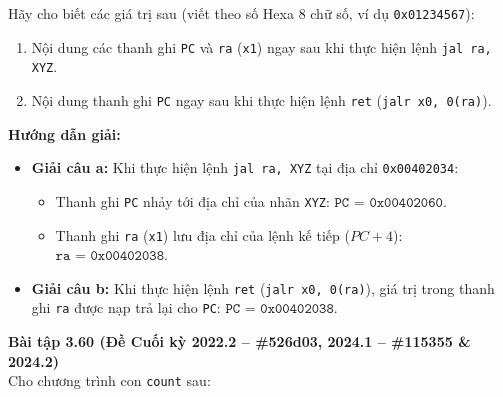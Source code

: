Hãy cho biết các giá trị sau (viết theo số Hexa 8 chữ số, ví dụ \texttt{0x01234567}):
\begin{enumerate}[label=\alph*)]
    \item Nội dung các thanh ghi \texttt{PC} và \texttt{ra} (\texttt{x1}) ngay sau khi thực hiện lệnh \texttt{jal ra, XYZ}.
    \item Nội dung thanh ghi \texttt{PC} ngay sau khi thực hiện lệnh \texttt{ret} (\texttt{jalr x0, 0(ra)}).
\end{enumerate}
\textbf{Hướng dẫn giải:}
\begin{itemize}
    \item \textbf{Giải câu a:} Khi thực hiện lệnh \texttt{jal ra, XYZ} tại địa chỉ \texttt{0x00402034}:
    \begin{itemize}
        \item Thanh ghi \texttt{PC} nhảy tới địa chỉ của nhãn \texttt{XYZ}: $\mathbf{\texttt{PC = 0x00402060}}$.
        \item Thanh ghi \texttt{ra} (\texttt{x1}) lưu địa chỉ của lệnh kế tiếp ($PC + 4$): $\mathbf{\texttt{ra = 0x00402038}}$.
    \end{itemize}
    \item \textbf{Giải câu b:} Khi thực hiện lệnh \texttt{ret} (\texttt{jalr x0, 0(ra)}), giá trị trong thanh ghi \texttt{ra} được nạp trả lại cho \texttt{PC}: $\mathbf{\texttt{PC = 0x00402038}}$.
\end{itemize}

\textbf{Bài tập 3.60 (Đề Cuối kỳ 2022.2 -- \#526d03, 2024.1 -- \#115355 \& 2024.2)}\\
Cho chương trình con \texttt{count} sau:

